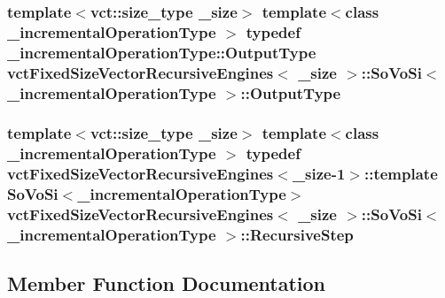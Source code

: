 \subsubsection[{Output\+Type}]{\setlength{\rightskip}{0pt plus 5cm}template$<$vct\+::size\+\_\+type \+\_\+size$>$ template$<$class \+\_\+incremental\+Operation\+Type $>$ typedef \+\_\+incremental\+Operation\+Type\+::\+Output\+Type {\bf vct\+Fixed\+Size\+Vector\+Recursive\+Engines}$<$ \+\_\+size $>$\+::{\bf So\+Vo\+Si}$<$ \+\_\+incremental\+Operation\+Type $>$\+::{\bf Output\+Type}}\label{classvct_fixed_size_vector_recursive_engines_1_1_so_vo_si_abbe36310e19f37465a117598a680abe5}
\hypertarget{classvct_fixed_size_vector_recursive_engines_1_1_so_vo_si_ab2cd530a2ba5ab1e525322aa03a14620}{}
\subsubsection[{Recursive\+Step}]{\setlength{\rightskip}{0pt plus 5cm}template$<$vct\+::size\+\_\+type \+\_\+size$>$ template$<$class \+\_\+incremental\+Operation\+Type $>$ typedef {\bf vct\+Fixed\+Size\+Vector\+Recursive\+Engines}$<$\+\_\+size-\/1$>$\+::template {\bf So\+Vo\+Si}$<$\+\_\+incremental\+Operation\+Type$>$ {\bf vct\+Fixed\+Size\+Vector\+Recursive\+Engines}$<$ \+\_\+size $>$\+::{\bf So\+Vo\+Si}$<$ \+\_\+incremental\+Operation\+Type $>$\+::{\bf Recursive\+Step}}\label{classvct_fixed_size_vector_recursive_engines_1_1_so_vo_si_ab2cd530a2ba5ab1e525322aa03a14620}


\subsection{Member Function Documentation}
\hypertarget{classvct_fixed_size_vector_recursive_engines_1_1_so_vo_si_a053a9f378611c29bc9b339addcae401f}{}
